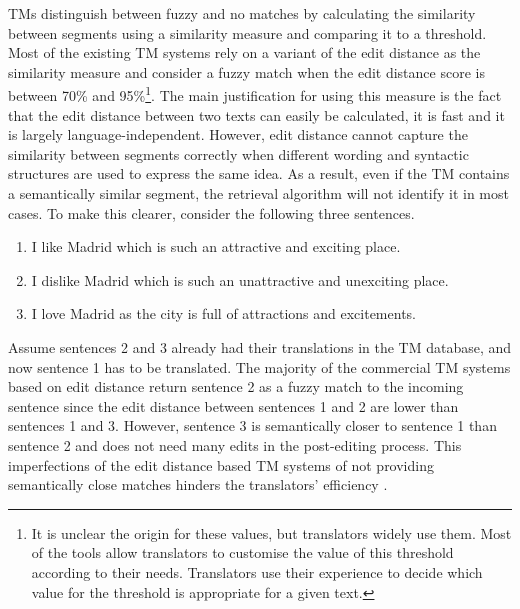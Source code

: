 TMs distinguish between fuzzy and no matches by calculating the similarity between segments using a similarity measure and comparing it to a threshold. Most of the existing TM systems rely on a variant of the edit distance as the similarity measure and consider a fuzzy match when the edit distance score is between 70\% and 95\%\footnote{It is unclear the origin for these values, but translators widely use them. Most of the tools allow translators to customise the value of this threshold according to their needs. Translators use their experience to decide which value for the threshold is appropriate for a given text.}. The main justification for using this measure is the fact that the edit distance between two texts can easily be calculated, it is fast and it is largely language-independent. However, edit distance cannot capture the similarity between segments correctly when different wording and syntactic structures are used to express the same idea. As a result, even if the TM contains a semantically similar segment, the retrieval algorithm will not identify it in most cases. To make this clearer, consider the following three sentences. 
 

\begin{enumerate}
	\item I like Madrid which is such an attractive and exciting place.
	\item I dislike Madrid which is such an unattractive and unexciting place.
	\item I love Madrid as the city is full of attractions and excitements.
\end{enumerate}


Assume sentences 2 and 3 already had their translations in the TM database, and now sentence 1 has to be translated. The majority of the commercial TM systems based on edit distance return sentence 2 as a fuzzy match to the incoming sentence since the edit distance between sentences 1 and 2 are lower than sentences 1 and 3. However, sentence 3 is semantically closer to sentence 1 than sentence 2 and does not need many edits in the post-editing process. This imperfections of the edit distance based TM systems of not providing semantically close matches hinders the translators' efficiency \autocite{ranasinghe-etal-2020-intelligent}. 

